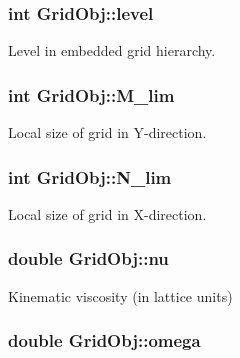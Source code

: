 \subsubsection[{\texorpdfstring{level}{level}}]{\setlength{\rightskip}{0pt plus 5cm}int Grid\+Obj\+::level}\hypertarget{class_grid_obj_a7dfedc4442a386ec15c8b03ca899c1a9}{}\label{class_grid_obj_a7dfedc4442a386ec15c8b03ca899c1a9}


Level in embedded grid hierarchy. 

\subsubsection[{\texorpdfstring{M\+\_\+lim}{M_lim}}]{\setlength{\rightskip}{0pt plus 5cm}int Grid\+Obj\+::\+M\+\_\+lim}\hypertarget{class_grid_obj_a01d3f362634c896ecdb80f0e6304c12f}{}\label{class_grid_obj_a01d3f362634c896ecdb80f0e6304c12f}


Local size of grid in Y-\/direction. 

\subsubsection[{\texorpdfstring{N\+\_\+lim}{N_lim}}]{\setlength{\rightskip}{0pt plus 5cm}int Grid\+Obj\+::\+N\+\_\+lim}\hypertarget{class_grid_obj_a5eb35752a7c0741510975d9ee6aa3ce1}{}\label{class_grid_obj_a5eb35752a7c0741510975d9ee6aa3ce1}


Local size of grid in X-\/direction. 

\subsubsection[{\texorpdfstring{nu}{nu}}]{\setlength{\rightskip}{0pt plus 5cm}double Grid\+Obj\+::nu}\hypertarget{class_grid_obj_a755f85eb5480d959211e00937a478ae9}{}\label{class_grid_obj_a755f85eb5480d959211e00937a478ae9}


Kinematic viscosity (in lattice units) 

\subsubsection[{\texorpdfstring{omega}{omega}}]{\setlength{\rightskip}{0pt plus 5cm}double Grid\+Obj\+::omega}\hypertarget{class_grid_obj_a21461e5d39c5ae83ae42170c829e9da3}{}\label{class_grid_obj_a21461e5d39c5ae83ae42170c829e9da3}


